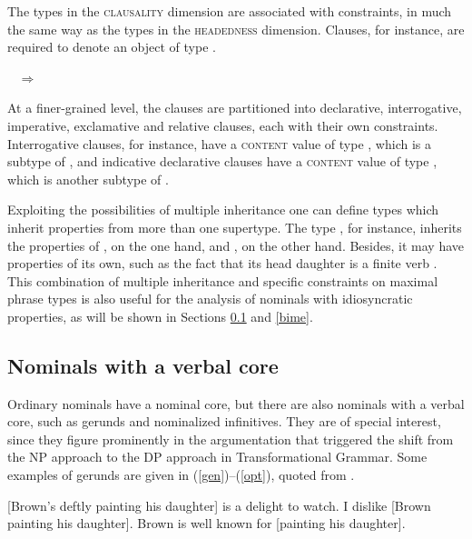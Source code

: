 \documentclass[output=paper
                ,modfonts
                ,nonflat
	        ,collection
	        ,collectionchapter
	        ,collectiontoclongg
 	        ,biblatex
                ,babelshorthands
                ,newtxmath
                ,draftmode
                ,colorlinks, citecolor=brown
]{./langsci/langscibook}
\begin{document}
The types in the \textsc{clausality} dimension are associated with constraints,
in much the same way as the types in the \textsc{headedness} dimension.  
Clauses, for instance, are required to denote an object of type  
\citep[41]{GS00}.

\begin{exe}
\ex {} ~ $\Rightarrow$ ~ 
\begin{avm}
\end{avm}
\end{exe}

\noindent
At a finer-grained level, the clauses are partitioned into 
declarative, interrogative, imperative, exclamative and relative
clauses, each with their own constraints. 
Interrogative clauses, for instance, have a \textsc{content} value of type 
, which is a subtype of , and 
indicative declarative clauses have a \textsc{content} value of type 
, which is another subtype of .

Exploiting the possibilities of multiple inheritance one can 
define types which inherit properties from more than one supertype. 
The type , for instance, inherits 
the properties of , on the one hand, and 
, on the other hand. Besides, it may 
have properties of its own, such as the fact that its head daughter 
is a finite verb \citep[43]{GS00}. 
This combination of multiple inheritance and specific   
constraints on maximal phrase types is also useful for the analysis of 
nominals with idiosyncratic properties, as will be shown in Sections \ref{geru} 
and \ref{bime}. 


\subsection{Nominals with a verbal core} 
\label{geru}


Ordinary nominals have a nominal core, but there are also nominals  
with a verbal core, such as gerunds and nominalized infinitives. They are 
of special interest, since they figure prominently in the argumentation 
that triggered the shift from the NP approach to the DP approach in Transformational 
Grammar. Some examples of gerunds are given in (\ref{gen})--(\ref{opt}), 
quoted from \citet[1290]{Quirketal85}. 

\begin{exe} 
\ex\label{gen}  [Brown's deftly painting his daughter] is a delight to watch. 
\ex\label{acc}  I dislike [Brown painting his daughter]. 
\ex\label{opt}  Brown is well known for [painting his daughter].
\end{exe}
\end{document}

